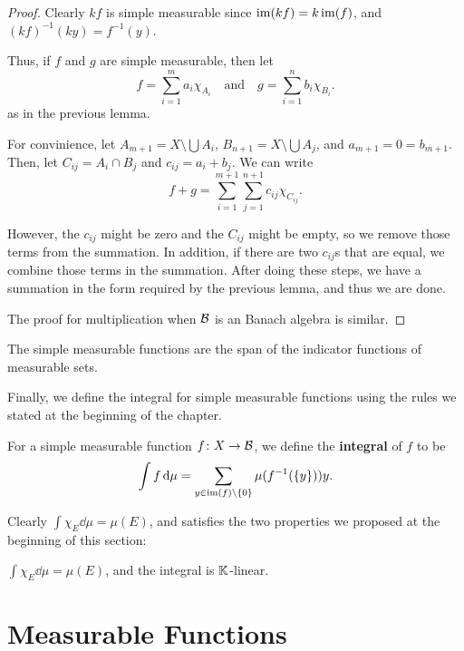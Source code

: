 \begin{proof}
    Clearly $kf$ is simple measurable since $\operatorname{im}(kf) = k\operatorname{im}(f)$, and $(kf)^{-1}(ky) = f^{-1}(y)$.

    Thus, if $f$ and $g$ are simple measurable, then let \[f = \sum_{i = 1}^m a_i\chi_{A_i}\quad \text{and}\quad g = \sum_{i = 1}^n b_i\chi_{B_i}.\] as in the previous lemma.

    For convinience, let $A_{m + 1} = X \setminus \bigcup A_i$, $B_{n + 1} = X \setminus \bigcup A_j$, and $a_{m + 1} = 0 = b_{m + 1}$. Then, let $C_{ij} = A_i \cap B_j$ and $c_{ij} = a_i + b_j$. We can write \[f + g = \sum_{i = 1}^{m + 1} \sum_{j = 1}^{n + 1} c_{ij}\chi_{C_{ij}}.\] 
    
    However, the $c_{ij}$ might be zero and the $C_{ij}$ might be empty, so we remove those terms from the summation. In addition, if there are two $c_{ij}$s that are equal, we combine those terms in the summation. After doing these steps, we have a summation in the form required by the previous lemma, and thus we are done.

    The proof for multiplication when $\mathcal B$ is an Banach algebra is similar.
\end{proof}

\begin{corollary}
    The simple measurable functions are the span of the indicator functions of measurable sets.
\end{corollary}

Finally, we define the integral for simple measurable functions using the rules we stated at the beginning of the chapter.

\begin{definition}
    For a simple measurable function $f \colon X \to \mathcal B$, we define the \textbf{integral} of $f$ to be \[\int f \dd{\mu} = \sum_{y \in \operatorname{im}(f) \setminus \qty{0}} \mu(f^{-1}(\{y\}))y.\]
\end{definition}

Clearly $\int \chi_E \dd{\mu} = \mu(E)$, and satisfies the two properties we proposed at the beginning of this section:

\begin{proposition}
    $\int \chi_E \dd{\mu} = \mu(E)$, and the integral is $\mathbb K$-linear.
\end{proposition}

\section{Measurable Functions}

